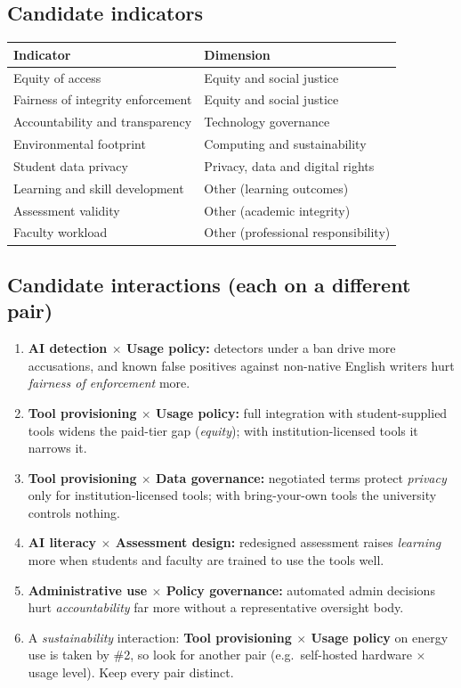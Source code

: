 \documentclass[11pt,a4paper]{article}
\begin{document}
\subsection{Candidate indicators}
\begin{tabularx}{\textwidth}{@{}p{6cm}L@{}}
\toprule
\textbf{Indicator} & \textbf{Dimension} \\
\midrule
Equity of access & Equity and social justice \\
Fairness of integrity enforcement & Equity and social justice \\
Accountability and transparency & Technology governance \\
Environmental footprint & Computing and sustainability \\
Student data privacy & Privacy, data and digital rights \\
Learning and skill development & Other (learning outcomes) \\
Assessment validity & Other (academic integrity) \\
Faculty workload & Other (professional responsibility) \\
\bottomrule
\end{tabularx}

\subsection{Candidate interactions (each on a different pair)}
\begin{enumerate}
  \item \textbf{AI detection $\times$ Usage policy:} detectors under a ban drive more accusations,
        and known false positives against non-native English writers hurt \emph{fairness of
        enforcement} more.
  \item \textbf{Tool provisioning $\times$ Usage policy:} full integration with student-supplied
        tools widens the paid-tier gap (\emph{equity}); with institution-licensed tools it narrows it.
  \item \textbf{Tool provisioning $\times$ Data governance:} negotiated terms protect
        \emph{privacy} only for institution-licensed tools; with bring-your-own tools the university
        controls nothing.
  \item \textbf{AI literacy $\times$ Assessment design:} redesigned assessment raises
        \emph{learning} more when students and faculty are trained to use the tools well.
  \item \textbf{Administrative use $\times$ Policy governance:} automated admin decisions hurt
        \emph{accountability} far more without a representative oversight body.
  \item A \emph{sustainability} interaction: \textbf{Tool provisioning $\times$ Usage policy} on
        energy use is taken by \#2, so look for another pair (e.g.\ self-hosted hardware $\times$
        usage level). Keep every pair distinct.
\end{enumerate}
\end{document}
